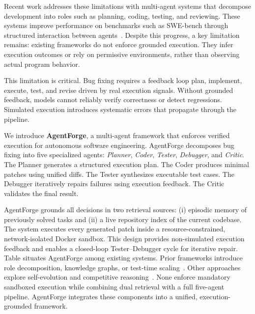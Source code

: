 \documentclass[journal]{IEEEtran}
\begin{document}
Recent work addresses these limitations with multi-agent systems that decompose development into roles such as planning, coding, testing, and reviewing. These systems improve performance on benchmarks such as SWE-bench through structured interaction between agents~\cite{trae2025}. Despite this progress, a key limitation remains: existing frameworks do not enforce grounded execution. They infer execution outcomes or rely on permissive environments, rather than observing actual program behavior.


This limitation is critical. Bug fixing requires a feedback loop plan, implement, execute, test, and revise driven by real execution signals. Without grounded feedback, models cannot reliably verify correctness or detect regressions. Simulated execution introduces systematic errors that propagate through the pipeline.


We introduce \textbf{AgentForge}, a multi-agent framework that enforces verified execution for autonomous software engineering. AgentForge decomposes bug fixing into five specialized agents: \textit{Planner}, \textit{Coder}, \textit{Tester}, \textit{Debugger}, and \textit{Critic}. The Planner generates a structured execution plan. The Coder produces minimal patches using unified diffs. The Tester synthesizes executable test cases. The Debugger iteratively repairs failures using execution feedback. The Critic validates the final result.

AgentForge grounds all decisions in two retrieval sources: (i) episodic memory of previously solved tasks and (ii) a live repository index of the current codebase. The system executes every generated patch inside a resource-constrained, network-isolated Docker sandbox. This design provides non-simulated execution feedback and enables a closed-loop Tester–Debugger cycle for iterative repair.
Table \label{tab:frameworks_axes} situates AgentForge among existing systems. Prior frameworks introduce role decomposition, knowledge graphs, or test-time scaling~\cite{khanzadeh2025agentmesh,tao2024magis,sgagent2026,trae2025}. Other approaches explore self-evolution and competitive reasoning~\cite{ecoevolve2026,swedebate2026}. None enforce mandatory sandboxed execution while combining dual retrieval with a full five-agent pipeline. AgentForge integrates these components into a unified, execution-grounded framework.
\end{document}
